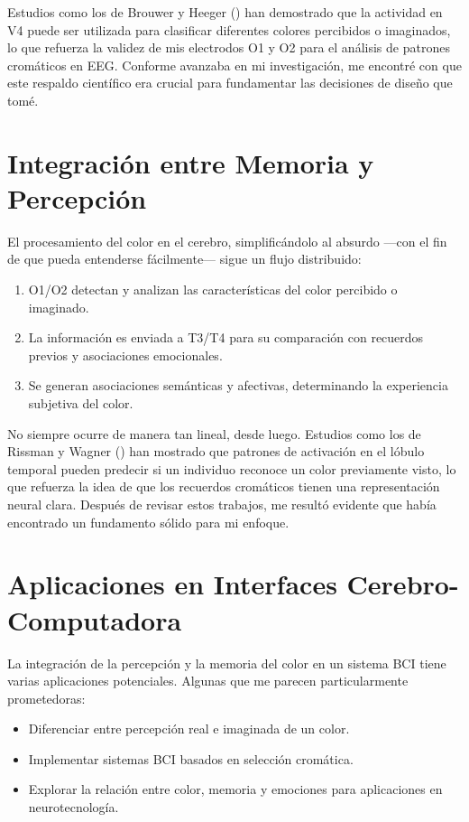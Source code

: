 Estudios como los de Brouwer y Heeger (\citeyear{Brouwer_Heeger_2013}) han demostrado que la actividad en V4 puede ser utilizada para clasificar diferentes colores percibidos o imaginados, lo que refuerza la validez de mis electrodos O1 y O2 para el análisis de patrones cromáticos en EEG. Conforme avanzaba en mi investigación, me encontré con que este respaldo científico era crucial para fundamentar las decisiones de diseño que tomé.

\newpage

\section{Integración entre Memoria y Percepción}
El procesamiento del color en el cerebro, simplificándolo al absurdo —con el fin de que pueda entenderse fácilmente— sigue un flujo distribuido:
\begin{enumerate}
    \item O1/O2 detectan y analizan las características del color percibido o imaginado.
    \item La información es enviada a T3/T4 para su comparación con recuerdos previos y asociaciones emocionales.
    \item Se generan asociaciones semánticas y afectivas, determinando la experiencia subjetiva del color.
\end{enumerate}

No siempre ocurre de manera tan lineal, desde luego. Estudios como los de Rissman y Wagner (\citeyear{Rissman_Wagner_2012}) han mostrado que patrones de activación en el lóbulo temporal pueden predecir si un individuo reconoce un color previamente visto, lo que refuerza la idea de que los recuerdos cromáticos tienen una representación neural clara. Después de revisar estos trabajos, me resultó evidente que había encontrado un fundamento sólido para mi enfoque.

\section{Aplicaciones en Interfaces Cerebro-Computadora}

La integración de la percepción y la memoria del color en un sistema BCI tiene varias aplicaciones potenciales. Algunas que me parecen particularmente prometedoras:

\begin{itemize}
    \item Diferenciar entre percepción real e imaginada de un color.
    \item Implementar sistemas BCI basados en selección cromática.
    \item Explorar la relación entre color, memoria y emociones para aplicaciones en neurotecnología.
\end{itemize}

